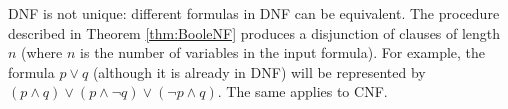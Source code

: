 

\setcounter{section}{2}
\setcounter{subsection}{0}
\setcounter{dfn}{20}


DNF is not unique: different formulas in DNF can be equivalent.
The procedure described in Theorem \ref{thm:BooleNF} produces a disjunction of clauses of length $n$ (where $n$ is the number of variables in the input formula).
For example, the formula $p \vee q$ (although it is already in DNF) will be represented by $(p \wedge q) \vee (p \wedge \neg q) \vee (\neg p \wedge q)$.
The same applies to CNF.




